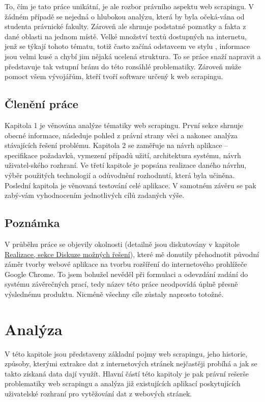 \documentclass[thesis=B,czech]{FITthesis}[2012/06/26]
\begin{document}
\begin{introduction}
	To, čím je tato práce unikátní, je ale rozbor právního aspektu web scrapingu. V žádném případě se nejedná o hlubokou analýzu, která by byla očeká-vána od studenta právnické fakulty. Zároveň ale shrnuje podstatné poznatky a fakta z dané oblasti na jednom místě. Velké množství textů dostupných na internetu, jenž se týkají tohoto tématu, totiž často začíná odstavcem ve stylu , informace jsou velmi kusé a chybí jim nějaká ucelená struktura. To se práce snaží napravit a představuje tak vstupní bránu do této rozsáhlé problematiky. Zároveň může pomoct všem vývojářům, kteří tvoří software určený k web scrapingu.
	
	\section*{Členění práce}
	Kapitola 1 je věnována analýze tématiky web scrapingu. První sekce shrnuje obecné informace, následuje pohled z právní strany věci a nakonec analýza stávajících řešení problému. Kapitola 2 se zaměřuje na návrh aplikace -- specifikace požadavků, vymezení případů užití, architektura systému, návrh uživatel-ského rozhraní. Ve třetí kapitole je popsána realizace daného návrhu, výběr použitých technologií a odůvodnění rozhodnutí, která byla učiněna. Poslední kapitola je věnovaná testování celé aplikace. V samotném závěru se pak zabý-vám vyhodnocením jednotlivých cílů zadaných výše.
	
	\section*{Poznámka}
	V průběhu práce se objevily okolnosti (detailně jsou diskutovány v kapitole \hyperref[sec:possible_solutions]{Realizace, sekce Diskuze možných řešení}), které mě donutily přehodnotit původní záměr tvorby webové aplikace na tvorbu rozšíření do internetového prohlížeče Google Chrome. To jsem bohužel nevěděl při formulaci a odevzdání zadání do systému závěrečných prací, tedy název této práce neodpovídá úplně přesně výslednému produktu. Nicméně všechny cíle zůstaly naprosto totožné.
\end{introduction}




\chapter{Analýza}
V této kapitole jsou představeny základní pojmy web scrapingu, jeho historie, způsoby, kterými extrakce dat z internetových stránek nejčastěji probíhá a jak se takto získaná data dají využít. Hlavní částí této kapitoly je pak právní rešerše problematiky web scrapingu a analýza již existujících aplikací poskytujících uživatelské rozhraní pro vytěžování dat z webových stránek.
\end{document}
